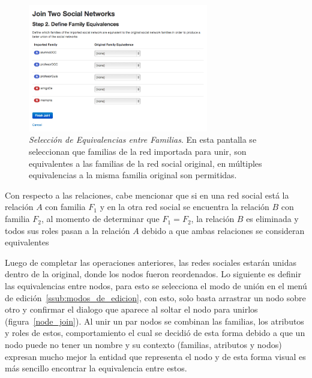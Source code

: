 \begin{figure}[H]
  \centering
  \includegraphics[width=0.7\textwidth]{images/equivalencia_familias.png}
  \caption[Selección de Equivalencias entre Familias]{\emph{Selección de Equivalencias entre Familias}. En esta pantalla se seleccionan que familias de la red importada para unir, son equivalentes a las familias de la red social original, en múltiples equivalencias a la misma familia original son permitidas.}
  \label{equivalencia_familias}
\end{figure}

Con respecto a las relaciones, cabe mencionar que si en una red social está la relación $A$ con familia $F_1$ y en la otra red social se encuentra la relación $B$ con familia $F_2$, al momento de determinar que $F_1 = F_2$, la relación $B$ es eliminada y todos sus roles pasan a la relación $A$ debido a que ambas relaciones se consideran equivalentes

Luego de completar las operaciones anteriores, las redes sociales estarán unidas dentro de la original, donde los nodos fueron reordenados. Lo siguiente es definir las equivalencias entre nodos, para esto se selecciona el modo de unión en el menú de edición~\ref{ssub:modos_de_edicion}, con esto, solo basta arrastrar un nodo sobre otro y confirmar el dialogo que aparece al soltar el nodo para unirlos (figura~\ref{node_join}). Al unir un par nodos se combinan las familias, los atributos y roles de estos, comportamiento el cual se decidió de esta forma debido a que un nodo puede no tener un nombre y su contexto (familias, atributos y nodos) expresan mucho mejor la entidad que representa el nodo y de esta forma visual es más sencillo encontrar la equivalencia entre estos.

